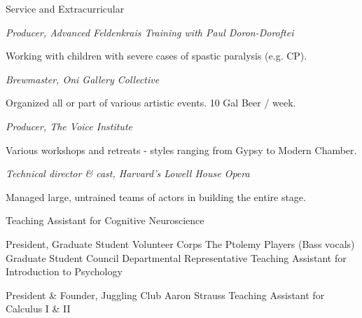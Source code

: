 \begin{rubric}{Service and Extracurricular}

\entry*[2004] \emph{Producer, Advanced Feldenkrais Training with Paul Doron-Doroftei}
\par Working with children with severe cases of spastic paralysis (e.g. CP).

\entry*[2003] \emph{Brewmaster, Oni Gallery Collective}
\par Organized all or part of various artistic events.  10 Gal Beer / week.

\entry*[2001-2003] \emph{Producer, The Voice Institute}
\par Various workshops and retreats - styles ranging from Gypsy to Modern Chamber.

\entry*[2003] \emph{Technical director \& cast, Harvard's Lowell House Opera} 
\par Managed large, untrained teams of actors in building the entire stage.

\entry*[2007] Teaching Assistant for Cognitive Neuroscience 

\entry*[2001--2002] President, Graduate Student Volunteer Corps
\entry*[2001--2002] The Ptolemy Players (Bass vocals)
\entry*[2001] Graduate Student Council Departmental Representative
\entry*[2000] Teaching Assistant for Introduction to Psychology       

\entry*[1996--1999] President \& Founder, Juggling Club
\entry*[1996--1997] Aaron Strauss Teaching Assistant for Calculus I \& II

\end{rubric}
